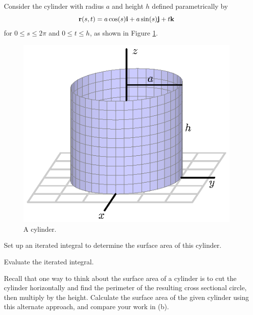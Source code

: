 \begin{activity} \label{A:11.6.4} Consider the cylinder with radius $a$ and height $h$ defined parametrically by
\[\mathbf{r}(s,t) = a\cos(s) \mathbf{i} + a\sin(s) \mathbf{j} + t \mathbf{k}\]
for $0 \leq s \leq 2\pi$ and $0 \leq t \leq h$, as shown in Figure \ref{F:11.6.SA_cylinder_ex}.
\begin{figure}[h]
\begin{center}
  \includegraphics{figures/fig_11_6_cylinder.eps}
\end{center}
\caption{A cylinder.}
\label{F:11.6.SA_cylinder_ex}
\end{figure}
	\ba
	\item Set up an iterated integral to determine the surface area of this cylinder.
	
	\item Evaluate the iterated integral. 
	
	\item Recall that one way to think about the surface area of a cylinder is to cut the cylinder horizontally and find the perimeter of the resulting cross sectional circle, then multiply by the height.  Calculate the surface area of the given cylinder using this alternate approach, and compare your work in (b).

	\ea

\end{activity}
\begin{smallhint}

\end{smallhint}

